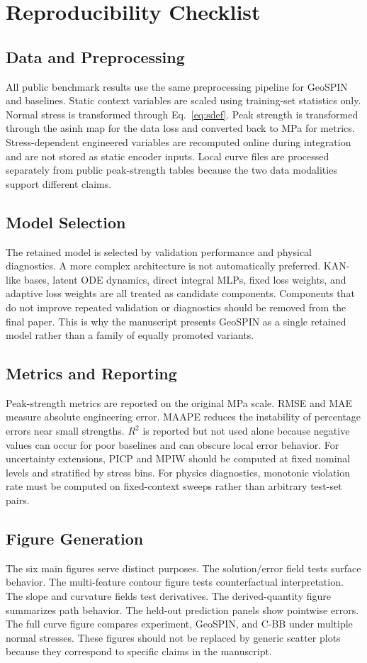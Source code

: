 \documentclass[journal]{IEEEtran}
\begin{document}
\section{Reproducibility Checklist}
\subsection{Data and Preprocessing}
All public benchmark results use the same preprocessing pipeline for GeoSPIN and baselines. Static context variables are scaled using training-set statistics only. Normal stress is transformed through Eq.~\eqref{eq:sdef}. Peak strength is transformed through the asinh map for the data loss and converted back to MPa for metrics. Stress-dependent engineered variables are recomputed online during integration and are not stored as static encoder inputs. Local curve files are processed separately from public peak-strength tables because the two data modalities support different claims.

\subsection{Model Selection}
The retained model is selected by validation performance and physical diagnostics. A more complex architecture is not automatically preferred. KAN-like bases, latent ODE dynamics, direct integral MLPs, fixed loss weights, and adaptive loss weights are all treated as candidate components. Components that do not improve repeated validation or diagnostics should be removed from the final paper. This is why the manuscript presents GeoSPIN as a single retained model rather than a family of equally promoted variants.

\subsection{Metrics and Reporting}
Peak-strength metrics are reported on the original MPa scale. RMSE and MAE measure absolute engineering error. MAAPE reduces the instability of percentage errors near small strengths. $R^2$ is reported but not used alone because negative values can occur for poor baselines and can obscure local error behavior. For uncertainty extensions, PICP and MPIW should be computed at fixed nominal levels and stratified by stress bins. For physics diagnostics, monotonic violation rate must be computed on fixed-context sweeps rather than arbitrary test-set pairs.

\subsection{Figure Generation}
The six main figures serve distinct purposes. The solution/error field tests surface behavior. The multi-feature contour figure tests counterfactual interpretation. The slope and curvature fields test derivatives. The derived-quantity figure summarizes path behavior. The held-out prediction panels show pointwise errors. The full curve figure compares experiment, GeoSPIN, and C-BB under multiple normal stresses. These figures should not be replaced by generic scatter plots because they correspond to specific claims in the manuscript.
\end{document}
